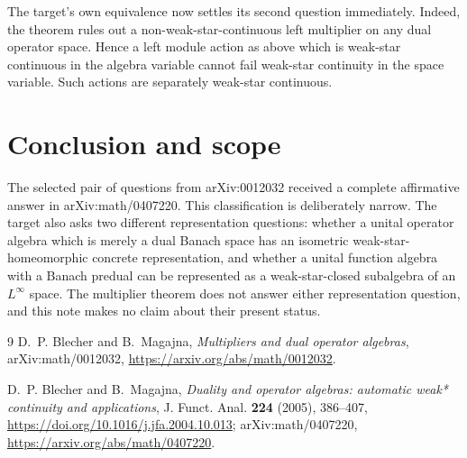\documentclass[11pt]{article}
\begin{document}
The target's own equivalence now settles its second question immediately.
Indeed, the theorem rules out a non-weak-star-continuous left multiplier on
any dual operator space.  Hence a left module action as above which is
weak-star continuous in the algebra variable cannot fail weak-star
continuity in the space variable.  Such actions are separately weak-star
continuous.

\section*{Conclusion and scope}

The selected pair of questions from arXiv:0012032 received a complete
affirmative answer in arXiv:math/0407220.  This classification is deliberately
narrow.  The target also asks two different representation questions:
whether a unital operator algebra which is merely a dual Banach space has an
isometric weak-star-homeomorphic concrete representation, and whether a
unital function algebra with a Banach predual can be represented as a
weak-star-closed subalgebra of an $L^\infty$ space.  The multiplier theorem
does not answer either representation question, and this note makes no
claim about their present status.

\begin{thebibliography}{9}
D.~P. Blecher and B.~Magajna,
\emph{Multipliers and dual operator algebras},
arXiv:math/0012032,
\url{https://arxiv.org/abs/math/0012032}.

D.~P. Blecher and B.~Magajna,
\emph{Duality and operator algebras: automatic weak* continuity and
applications},
J. Funct. Anal. \textbf{224} (2005), 386--407,
\url{https://doi.org/10.1016/j.jfa.2004.10.013};
arXiv:math/0407220,
\url{https://arxiv.org/abs/math/0407220}.
\end{thebibliography}
\end{document}

